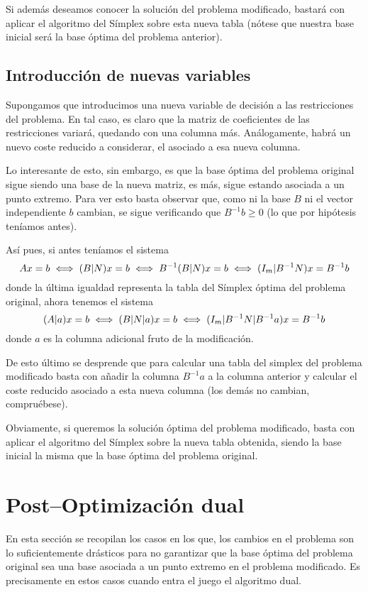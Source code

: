 Si además deseamos conocer la solución del problema modificado, bastará con aplicar el algoritmo del Símplex sobre esta nueva tabla (nótese que nuestra base inicial será la base óptima del problema anterior). 
\subsection{Introducción de nuevas variables}
Supongamos que introducimos una nueva variable de decisión a las restricciones del problema. En tal caso, es claro que la matriz de coeficientes de las restricciones variará, quedando con una columna más. Análogamente, habrá un nuevo coste reducido a considerar, el asociado a esa nueva columna.

Lo interesante de esto, sin embargo, es que la base óptima del problema original sigue siendo una base de la nueva matriz, es más, sigue estando asociada a un punto extremo. Para ver esto basta observar que, como ni la base $B$ ni el vector independiente $b$ cambian, se sigue verificando que $B^{-1}b\geq 0$ (lo que por hipótesis teníamos antes).

Así pues, si antes teníamos el sistema
\begin{equation*}
	Ax=b\iff (B|N)x=b\iff B^{-1}(B|N)x=b\iff (I_m|B^{-1}N)x=B^{-1}b
\end{equation*}
donde la última igualdad representa la tabla del Símplex óptima del problema original, ahora tenemos el sistema
\begin{equation*}
	(A|a)x=b\iff (B|N|a)x=b\iff (I_m|B^{-1}N|B^{-1}a)x=B^{-1}b
\end{equation*}
donde $a$ es la columna adicional fruto de la modificación.

De esto último se desprende que para calcular una tabla del simplex del problema modificado basta con añadir la columna $B^{-1}a$ a la columna anterior y calcular el coste reducido asociado a esta nueva columna (los demás no cambian, compruébese).

Obviamente, si queremos la solución óptima del problema modificado, basta con aplicar el algoritmo del Símplex sobre la nueva tabla obtenida, siendo la base inicial la misma que la base óptima del problema original.
\section{Post--Optimización dual}
En esta sección se recopilan los casos en los que, los cambios en el problema son lo suficientemente drásticos para no garantizar que la base óptima del problema original sea una base asociada a un punto extremo en el problema modificado. Es precisamente en estos casos cuando entra el juego el algoritmo dual.
